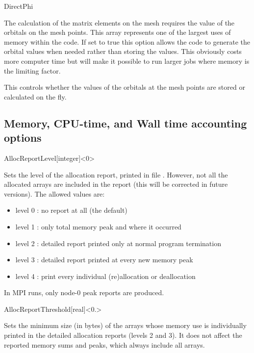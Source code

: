 \begin{fdflogicalF}{DirectPhi}

  The calculation of the matrix elements on the mesh requires the
  value of the orbitals on the mesh points. This array represents one
  of the largest uses of memory within the code. If set to true this
  option allows the code to generate the orbital values when needed
  rather than storing the values. This obviously costs more computer
  time but will make it possible to run larger jobs where memory is
  the limiting factor.

  This controls whether the values of the orbitals at the mesh points
  are stored or calculated on the fly.
  
\end{fdflogicalF}


\subsection{Memory, CPU-time, and Wall time accounting options}

\begin{fdfentry}{AllocReportLevel}[integer]<$0$>

  Sets the level of the allocation report, printed in file
  . However, not all the allocated arrays are included
  in the report (this will be corrected in future versions). The
  allowed values are:
  \begin{itemize}
    \item%
    level 0 : no report at all (the default)
    \item%
    level 1 : only total memory peak and where it occurred
    \item%
    level 2 : detailed report printed only at
    normal program termination
    \item%
    level 3 : detailed report printed at every new memory peak
    \item%
    level 4 : print every individual (re)allocation or deallocation
  \end{itemize}

  \note In MPI runs, only node-0 peak reports are produced.
  
\end{fdfentry}


\begin{fdfentry}{AllocReportThreshold}[real]<$0.$>

Sets the minimum size (in bytes) of the arrays whose memory use is
individually printed in the detailed allocation reports (levels 2 and
3). It does not affect the reported memory sums and peaks, which
always include all arrays.
  
\end{fdfentry}

